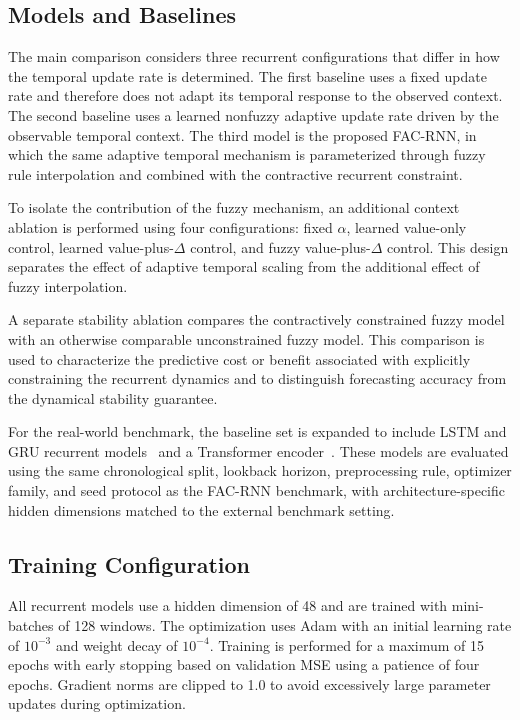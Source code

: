 \documentclass[journal]{IEEEtran}
\begin{document}
\subsection{Models and Baselines}
\label{subsec:baselines}

The main comparison considers three recurrent configurations that differ in how the temporal update rate is determined. The first baseline uses a fixed update rate and therefore does not adapt its temporal response to the observed context. The second baseline uses a learned nonfuzzy adaptive update rate driven by the observable temporal context. The third model is the proposed FAC-RNN, in which the same adaptive temporal mechanism is parameterized through fuzzy rule interpolation and combined with the contractive recurrent constraint.

To isolate the contribution of the fuzzy mechanism, an additional context ablation is performed using four configurations: fixed $\alpha$, learned value-only control, learned value-plus-$\Delta$ control, and fuzzy value-plus-$\Delta$ control. This design separates the effect of adaptive temporal scaling from the additional effect of fuzzy interpolation.

A separate stability ablation compares the contractively constrained fuzzy model with an otherwise comparable unconstrained fuzzy model. This comparison is used to characterize the predictive cost or benefit associated with explicitly constraining the recurrent dynamics and to distinguish forecasting accuracy from the dynamical stability guarantee.

For the real-world benchmark, the baseline set is expanded to include LSTM and GRU recurrent models~\cite{hochreiter1997long,cho2014gru} and a Transformer encoder~\cite{vaswani2017attention}. These models are evaluated using the same chronological split, lookback horizon, preprocessing rule, optimizer family, and seed protocol as the FAC-RNN benchmark, with architecture-specific hidden dimensions matched to the external benchmark setting.

\subsection{Training Configuration}
\label{subsec:training}

All recurrent models use a hidden dimension of 48 and are trained with mini-batches of 128 windows. The optimization uses Adam with an initial learning rate of $10^{-3}$ and weight decay of $10^{-4}$. Training is performed for a maximum of 15 epochs with early stopping based on validation MSE using a patience of four epochs. Gradient norms are clipped to 1.0 to avoid excessively large parameter updates during optimization.
\end{document}
